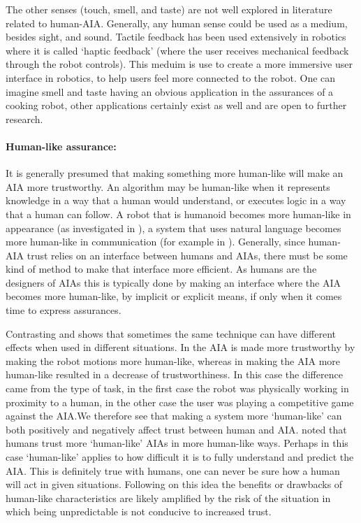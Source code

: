     The other senses (touch, smell, and taste) are not well explored in literature related to human-AIA. Generally, any human sense could be used as a medium, besides sight, and sound. Tactile feedback has been used extensively in robotics where it is called `haptic feedback' (where the user receives mechanical feedback through the robot controls). This meduim is use to create a more immersive user interface in robotics, to help users feel more connected to the robot. One can imagine smell and taste having an obvious application in the assurances of a cooking robot, other applications certainly exist as well and are open to further research.

    \paragraph{Human-like assurance:} It is generally presumed that making something more human-like will make an AIA more trustworthy. An algorithm may be human-like when it represents knowledge in a way that a human would understand, or executes logic in a way that a human can follow. A robot that is humanoid becomes more human-like in appearance (as investigated in \cite{Bainbridge2011-pl}), a system that uses natural language becomes more human-like in communication (for example in \cite{Lacave2002-cu}). Generally, since human-AIA trust relies on an interface between humans and AIAs, there must be some kind of method to make that interface more efficient. As humans are the designers of AIAs this is typically done by making an interface where the AIA becomes more human-like, by implicit or explicit means, if only when it comes time to express assurances.

    Contrasting \cite{Dragan2013-wd} and \cite{Wu2016-ei} shows that sometimes the same technique can have different effects when used in different situations. In \cite{Dragan2013-wd} the AIA is made more trustworthy by making the robot motions more human-like, whereas in \cite{Wu2016-ei} making the AIA more human-like resulted in a decrease of trustworthiness. In this case the difference came from the type of task, in the first case the robot was physically working in proximity to a human, in the other case the user was playing a competitive game against the AIA.We therefore see that making a system more `human-like' can both positively and negatively affect trust between human and AIA. \citet{Tripp2011-rx} noted that humans trust more `human-like' AIAs in more human-like ways. Perhaps in this case `human-like' applies to how difficult it is to fully understand and predict the AIA. This is definitely true with humans, one can never be sure how a human will act in given situations. Following on this idea the benefits or drawbacks of human-like characteristics are likely amplified by the risk of the situation in which being unpredictable is not conducive to increased trust.

